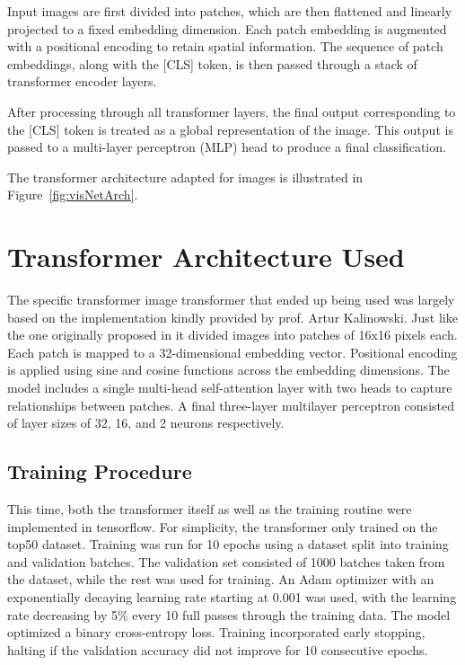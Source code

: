 \documentclass{pracalicmgr}
\begin{document}
Input images are first divided into patches, which are then flattened and linearly projected to a fixed embedding dimension. Each patch embedding is augmented with a positional encoding to retain spatial information. The sequence of patch embeddings, along with the [CLS] token, is then passed through a stack of transformer encoder layers.

After processing through all transformer layers, the final output corresponding to the [CLS] token is treated as a global representation of the image. This output is passed to a multi-layer perceptron (MLP) head to produce a final classification. 

The transformer architecture adapted for images is illustrated in Figure~\ref{fig:visNetArch}.

\section{Transformer Architecture Used}

The specific transformer image transformer that ended up being used was largely based on the implementation kindly provided by prof. Artur Kalinowski. Just like the one originally proposed in \cite{ViT} it divided images into patches of 16x16 pixels each. Each patch is mapped to a 32-dimensional embedding vector. Positional encoding is applied using sine and cosine functions across the embedding dimensions. The model includes a single multi-head self-attention layer with two heads to capture relationships between patches. A final three-layer multilayer perceptron consisted of layer sizes of 32, 16, and 2 neurons respectively.

\subsection{Training Procedure}

This time, both the transformer itself as well as the training routine were implemented in tensorflow. For simplicity, the transformer only trained on the top50 dataset. Training was run for 10 epochs using a dataset split into training and validation batches. The validation set consisted of 1000 batches taken from the dataset, while the rest was used for training. An Adam optimizer with an exponentially decaying learning rate starting at 0.001 was used, with the learning rate decreasing by 5\% every 10 full passes through the training data. The model optimized a binary cross-entropy loss. Training incorporated early stopping, halting if the validation accuracy did not improve for 10 consecutive epochs.
\end{document}
